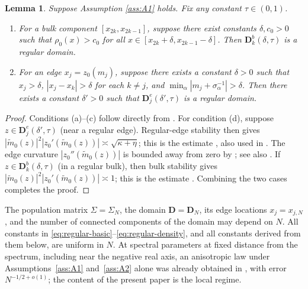 \documentclass[11pt,reqno]{amsart}
\def\bD{\mathbf{D}}
\newtheorem{lemma}[theorem]{Lemma}
\theoremstyle{definition}
\numberwithin{equation}{section}
\numberwithin{figure}{section}
\begin{document}
\begin{lemma} 
 Suppose Assumption \ref{ass:A1} holds. Fix any constant $\tau \in (0,1)$.
\begin{enumerate}
\item[(i)] For a bulk component $[x_{2k},x_{2k-1}]$, suppose there exist constants $\delta,c_0 >0$ such that $\rho_0 (x) > c_0$ for all $x \in [x_{2k} + \delta, x_{2k-1}- \delta]$. Then $\bD_k^b(\delta,\tau)$ is a regular domain.
\item[(ii)] For an edge $x_j = z_0 (m_j)$, suppose there exists a constant $\delta>0$ such that $x_j >\delta$, $|x_j - x_k| >\delta$ for each $k \neq j$, and $\min_{\alpha} | m_j + \sigma_\alpha^{-1} | > \delta$. Then there exists a constant $\delta'>0$ such that $\bD_j^e(\delta',\tau)$ is a regular domain.
\end{enumerate}
\end{lemma}

\begin{proof}
Conditions (a)--(c) follow directly from \cite[Lemma 2.4]{fan2026anisotropic}. For condition (d), suppose $z\in\bD_j^e(\delta',\tau)$ (near a regular edge). Regular-edge stability then gives $|\widetilde m_0(z)|^2|z_0'(\widetilde m_0(z))|\asymp\sqrt{\kappa+\eta}$; this is the estimate
\cite[(A.16)]{knowles2017anisotropic}, also used in
\cite[Lemma~C.3(b)]{fan2022tracy}. The edge curvature $|z_0''(\widetilde m_0(z))|$ is bounded away from zero by
\cite[Lemma~A.3, equation (A.9)]{knowles2017anisotropic}; see also
\cite[Propositions~3.1--3.3]{fan2022tracy}. If $z\in\bD_k^b(\delta,\tau)$ (in a regular bulk), then bulk stability gives $|\widetilde m_0(z)|^2|z_0'(\widetilde m_0(z))|\asymp 1$; this is the estimate \cite[Lemma A.6, equation (A.17)]{knowles2017anisotropic}. Combining the two cases completes the proof.
\end{proof}

The population matrix $\Sigma=\Sigma_N$, the domain $\bD=\bD_N$, its edge locations $x_j=x_{j,N}$, and the number of connected components of the domain may depend on $N$. All constants in \eqref{eq:regular-basic}--\eqref{eq:regular-density}, and all constants derived from them below, are uniform in $N$. At spectral parameters at fixed distance from the spectrum, including near the negative real axis, an anisotropic law under Assumptions~\ref{ass:A1} and~\ref{ass:A2} alone was already obtained in \cite[Theorem~2.10]{fan2026anisotropic}, with error $N^{-1/2+o(1)}$; the content of the present paper is the local regime.
\end{document}
